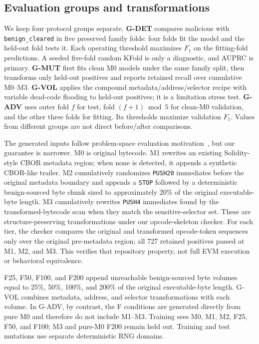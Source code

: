 \subsection{Evaluation groups and transformations}

We keep four protocol groups separate. \textbf{G-DET} compares malicious with \texttt{benign\_cleared} in five preserved family folds: four folds fit the model and the held-out fold tests it. Each operating threshold maximizes $F_1$ on the fitting-fold predictions. A seeded five-fold random KFold is only a diagnostic, and AUPRC is primary. \textbf{G-MUT} first fits clean M0 models under the same family split, then transforms only held-out positives and reports retained recall over cumulative M0--M3. \textbf{G-VOL} applies the compound metadata/address/selector recipe with variable dead-code flooding to held-out positives; it is a limitation stress test. \textbf{G-ADV} uses outer fold $f$ for test, fold $(f+1)\bmod 5$ for clean-M0 validation, and the other three folds for fitting. Its thresholds maximize validation $F_1$. Values from different groups are not direct before/after comparisons.

The generated inputs follow problem-space evaluation motivation~\cite{pierazzi2020problemspace}, but our guarantee is narrower. M0 is original bytecode. M1 rewrites an existing Solidity-style CBOR metadata region; when none is detected, it appends a synthetic CBOR-like trailer. M2 cumulatively randomizes \texttt{PUSH20} immediates before the original metadata boundary and appends a \texttt{STOP} followed by a deterministic benign-sourced byte chunk sized to approximately 20\% of the original executable-byte length. M3 cumulatively rewrites \texttt{PUSH4} immediates found by the transformed-bytecode scan when they match the sensitive-selector set. These are structure-preserving transformations under our opcode-skeleton checker. For each tier, the checker compares the original and transformed opcode-token sequences only over the original pre-metadata region; all 727 retained positives passed at M1, M2, and M3. This verifies that repository property, not full EVM execution or behavioral equivalence.

F25, F50, F100, and F200 append unreachable benign-sourced byte volumes equal to 25\%, 50\%, 100\%, and 200\% of the original executable-byte length. G-VOL combines metadata, address, and selector transformations with each volume. In G-ADV, by contrast, the F conditions are generated directly from pure M0 and therefore do not include M1--M3. Training sees M0, M1, M2, F25, F50, and F100; M3 and pure-M0 F200 remain held out. Training and test mutations use separate deterministic RNG domains.

